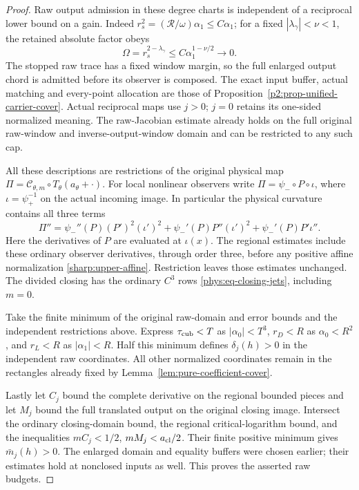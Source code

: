 \begin{proof}
Raw output admission in these degree charts is independent of a
reciprocal lower bound on a gain. Indeed
\(r_s^2=(\mathcal R/\omega)\alpha_1\le C\alpha_1\); for a fixed
\(|\lambda_\gamma|<\nu<1\), the retained absolute factor obeys
\[
\Omega=r_s^{2-\lambda_\gamma}
       \le C\alpha_1^{1-\nu/2}\longrightarrow0.
\]
The stopped raw trace has a fixed window margin, so the full enlarged
output chord is admitted before its observer is composed. The exact
input buffer, actual matching and every-point allocation are those of
Proposition~\ref{p2:prop-unified-carrier-cover}. Actual reciprocal
maps use \(j>0\); \(j=0\) retains its one-sided normalized meaning.
The raw-Jacobian estimate already holds on the full original raw-window
and inverse-output-window domain and can be restricted to any such cap.

All these descriptions are restrictions of the original physical map
\(\Pi=\mathcal C_{\theta,m}\circ T_\theta(a_\theta+\cdot)\).
For local nonlinear observers write
\(\Pi=\psi_-\circ P\circ\iota\), where
\(\iota=\psi_+^{-1}\) on the actual incoming image. In particular
the physical curvature contains all three terms
\begin{equation}\label{eq:raw-budget-complete-curvature}
\Pi''=\psi_-''(P)(P')^2(\iota')^2
       +\psi_-'(P)P''(\iota')^2
       +\psi_-'(P)P'\iota''.
\end{equation}
Here the derivatives of \(P\) are evaluated at \(\iota(x)\). The regional
estimates include these ordinary observer derivatives, through
order three, before any positive affine normalization
\eqref{sharp:upper-affine}. Restriction leaves those estimates unchanged.
The divided closing has the ordinary \(C^3\) rows
\eqref{phys:eq-closing-jets}, including \(m=0\).

Take the finite minimum of the original raw-domain and error bounds
and the independent restrictions above. Express
\(\tau_{\rm cub}<T\) as \(|\alpha_0|<T^3\),
\(r_D<R\) as \(\alpha_0<R^2\), and
\(r_L<R\) as \(|\alpha_1|<R\). Half this minimum defines
\(\delta_j(h)>0\) in the independent raw coordinates. All other
normalized coordinates remain in the rectangles already fixed by
Lemma~\ref{lem:pure-coefficient-cover}.

Lastly let \(C_j\) bound the complete derivative on the regional
bounded pieces and let \(M_j\) bound the full translated output on
the original closing image. Intersect the ordinary closing-domain
bound, the regional critical-logarithm bound, and the inequalities
\(mC_j<1/2\), \(mM_j<a_{\rm cl}/2\). Their finite positive
minimum gives \(\bar m_j(h)>0\). The enlarged domain and equality
buffers were chosen earlier; their estimates hold at nonclosed inputs
as well. This proves the asserted raw budgets.
\end{proof}
